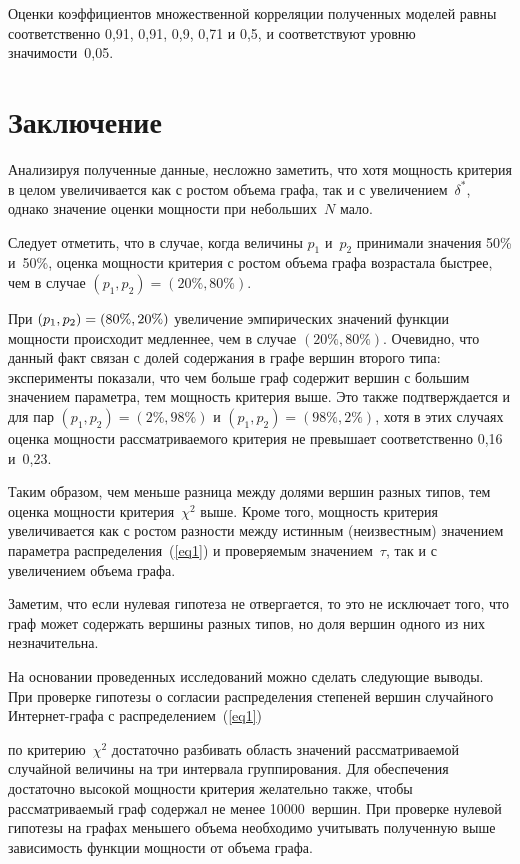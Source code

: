 \begin{multicols}{2}
\noindent
Оценки коэффициентов множественной корреляции полученных
моделей равны соответственно 0,91, 0,91, 0,9, 0,71 и
0,5, и соответствуют уровню значимости~0,05.

\section{Заключение}

Анализируя полученные данные, несложно заметить, что хотя мощность
критерия в целом увеличивается как с ростом объема графа, так и с
увеличением~$\delta^*$, однако значение оценки мощ\-ности при
небольших~$N$ мало. 

Следует отметить, что в случае, когда
величины $p_1$ и~$p_2$ принимали значения 50\% и~50\%, оценка
мощности критерия с ростом объема графа возрастала быстрее, чем в
случае $(p_1,p_2)=(20\%,80\%)$. 

При $(p_1,p_2)\hm=(80\%,20\%)$ 
увеличение эмпирических значений функции мощности
происходит медленнее, чем в случае $(20\%,80\%)$. Очевидно, что
данный факт связан с долей содержания в графе вершин
второго типа: эксперименты показали, что чем больше граф содержит
вершин с большим значением параметра, тем мощность критерия выше.
Это также подтверждается и для пар $(p_1,p_2)=(2\%,98\%)$ и
$(p_1,p_2)=(98\%,2\%)$, хотя в этих случаях оценка мощности
рассматри\-ва\-емого критерия не превышает соответственно 0,16 и~0,23. 
{

}

Таким образом, чем меньше разница между долями вершин
разных типов, тем оценка мощности критерия~$\chi^2$ выше. Кроме
того, мощность критерия увеличивается как с ростом разности между
истинным (неизвестным) значением параметра распределения~(\ref{eq1}) 
и проверяемым значением~$\tau$, так и с увеличением
объема графа. 

Заметим, что если нулевая гипотеза не отвергается,
то это не исключает того, что граф может содержать вершины разных
типов, но доля вершин одного из них не\-зна\-чи\-тельна.

На основании проведенных исследований можно сделать следующие
выводы. При проверке гипотезы о согласии распределения степеней
вершин случайного Ин\-тер\-нет-гра\-фа с распределением~(\ref{eq1})\linebreak\vspace*{-12pt}

\pagebreak

\noindent
 по
критерию~$\chi^2$ достаточно разбивать область значений
рассматриваемой случайной величины на три интервала группирования.
Для обеспечения достаточно высокой мощности критерия желательно
также, чтобы рассматриваемый граф содержал не менее 10000~вершин.
При проверке нулевой гипотезы на графах меньшего объема необходимо
учитывать полученную выше зависимость функции мощности от объема
графа.


\end{multicols}

